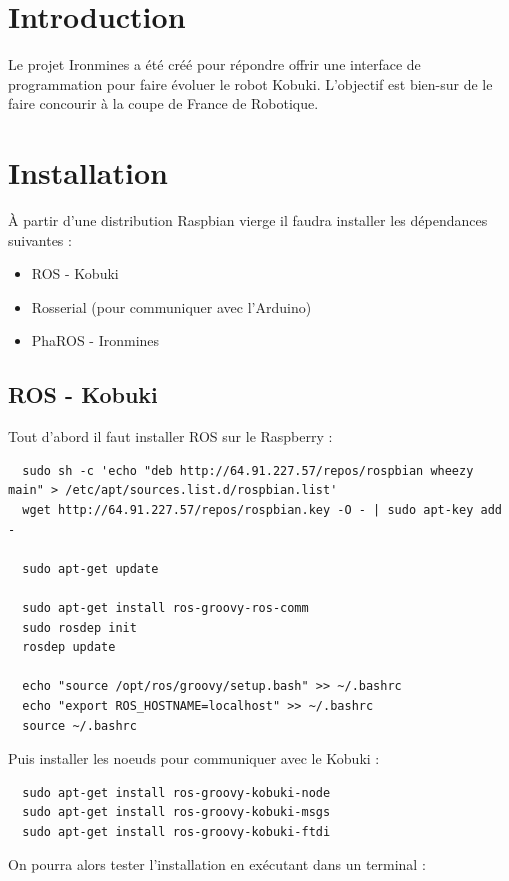 \documentclass[a4paper, 11pt]{article}
\begin{document}
\section{Introduction}

Le projet Ironmines a été créé pour répondre offrir une interface de
programmation pour faire évoluer le robot Kobuki. L'objectif est
bien-sur de le faire concourir à la coupe de France de Robotique.

\section{Installation}

À partir d'une distribution Raspbian vierge il faudra installer les
dépendances suivantes :
\begin{itemize}
\item ROS - Kobuki
\item Rosserial (pour communiquer avec l'Arduino)
\item PhaROS - Ironmines
\end{itemize}

\subsection{ROS - Kobuki}

Tout d'abord il faut installer ROS sur le Raspberry : 

\begin{lstlisting}
  sudo sh -c 'echo "deb http://64.91.227.57/repos/rospbian wheezy main" > /etc/apt/sources.list.d/rospbian.list'
  wget http://64.91.227.57/repos/rospbian.key -O - | sudo apt-key add -

  sudo apt-get update

  sudo apt-get install ros-groovy-ros-comm
  sudo rosdep init
  rosdep update

  echo "source /opt/ros/groovy/setup.bash" >> ~/.bashrc
  echo "export ROS_HOSTNAME=localhost" >> ~/.bashrc
  source ~/.bashrc
\end{lstlisting}

Puis installer les noeuds pour communiquer avec le Kobuki : 

\begin{lstlisting}
  sudo apt-get install ros-groovy-kobuki-node 
  sudo apt-get install ros-groovy-kobuki-msgs
  sudo apt-get install ros-groovy-kobuki-ftdi
\end{lstlisting}

On pourra alors tester l'installation en exécutant dans un terminal :
\end{document}
